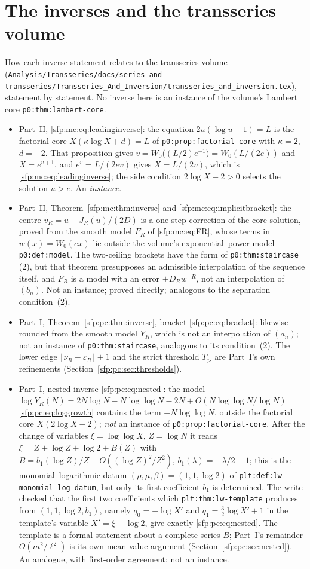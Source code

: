 \documentclass[11pt,letterpaper]{article}
\numberwithin{equation}{section}
\theoremstyle{definition}\newtheorem{definition}[theorem]{Definition}
\theoremstyle{remark}\newtheorem{remark}[theorem]{Remark}
\newcommand{\eps}{\varepsilon}
\newcommand{\file}[1]{\nolinkurl{#1}}
\begin{document}
\section*{The inverses and the transseries volume}\label{sfp:sec:inverses}
How each inverse statement relates to the transseries volume \cite{TSvol} (\file{Analysis/Transseries/docs/series-and-transseries/Transseries_And_Inversion/transseries_and_inversion.tex}), statement by statement. No inverse here is an instance of the volume's Lambert core \file{p0:thm:lambert-core}.
\begin{itemize}
\item Part~II, \eqref{sfp:mc:eq:leadinginverse}: the equation $2u(\log u-1)=L$ is the factorial core $X(\kappa\log X+d)=L$ of \file{p0:prop:factorial-core} with $\kappa=2$, $d=-2$. That proposition gives $v=W_0\bigl((L/2)e^{-1}\bigr)=W_0(L/(2e))$ and $X=e^{v+1}$, and $e^{v}=L/(2ev)$ gives $X=L/(2v)$, which is \eqref{sfp:mc:eq:leadinginverse}; the side condition $2\log X-2>0$ selects the solution $u>e$. An \emph{instance}.
\item Part~II, Theorem~\ref{sfp:mc:thm:inverse} and \eqref{sfp:mc:eq:implicitbracket}: the centre $v_R=u-J_R(u)/(2D)$ is a one-step correction of the core solution, proved from the smooth model $F_R$ of \eqref{sfp:mc:eq:FR}, whose terms in $w(x)=W_0(ex)$ lie outside the volume's exponential--power model \file{p0:def:model}. The two-ceiling brackets have the form of \file{p0:thm:staircase}\,(2), but that theorem presupposes an admissible interpolation of the sequence itself, and $F_R$ is a model with an error $\pm D_Rw^{-R}$, not an interpolation of $(b_n)$. Not an instance; proved directly; analogous to the separation condition~(2).
\item Part~I, Theorem~\ref{sfp:pc:thm:inverse}, bracket \eqref{sfp:pc:eq:bracket}: likewise rounded from the smooth model $Y_R$, which is not an interpolation of $(a_n)$; not an instance of \file{p0:thm:staircase}, analogous to its condition~(2). The lower edge $\lfloor\nu_R-\eps_R\rfloor+1$ and the strict threshold $T_>$ are Part~I's own refinements (Section~\ref{sfp:pc:sec:thresholds}).
\item Part~I, nested inverse \eqref{sfp:pc:eq:nested}: the model $\log Y_R(N)=2N\log N-N\log\log N-2N+O(N\log\log N/\log N)$ \eqref{sfp:pc:eq:loggrowth} contains the term $-N\log\log N$, outside the factorial core $X(2\log X-2)$; \emph{not} an instance of \file{p0:prop:factorial-core}. After the change of variables $\xi=\log\log X$, $Z=\log N$ it reads $\xi=Z+\log Z+\log2+B(Z)$ with $B=b_1(\log Z)/Z+O((\log Z)^2/Z^2)$, $b_1(\lambda)=-\lambda/2-1$; this is the monomial--logarithmic datum $(\rho,\mu,\beta)=(1,1,\log2)$ of \file{plt:def:lw-monomial-log-datum}, but only its first coefficient $b_1$ is determined. The write checked that the first two coefficients which \file{plt:thm:lw-template} produces from $(1,1,\log2,b_1)$, namely $q_0=-\log X'$ and $q_1=\frac32\log X'+1$ in the template's variable $X'=\xi-\log2$, give exactly \eqref{sfp:pc:eq:nested}. The template is a formal statement about a complete series $B$; Part~I's remainder $O(m^2/\ell^2)$ is its own mean-value argument (Section~\ref{sfp:pc:sec:nested}). An analogue, with first-order agreement; not an instance.

\end{itemize}
\end{document}
